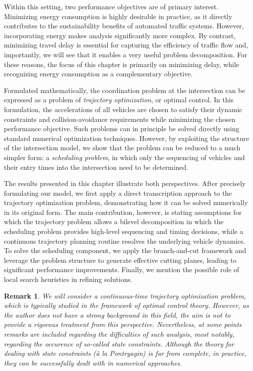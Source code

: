 \documentclass[a4paper]{report}
\theoremstyle{definition}
\theoremstyle{plain}
\newtheorem{remark}{Remark}[chapter]
\newcommand\note[1]{{\color{Navy}#1}}
\begin{document}
Within this setting, two performance objectives are of primary interest.
%
Minimizing energy consumption is highly desirable in practice, as it directly
contributes to the sustainability benefits of automated traffic systems.
%
However, incorporating energy makes analysis significantly more complex.
%
By contrast, minimizing travel delay is essential for capturing the efficiency
of traffic flow and, importantly, we will see that it enables a very useful
problem decomposition.
%
For these reasons, the focus of this chapter is primarily on minimizing delay,
while recognizing energy consumption as a complementary objective.

Formulated mathematically, the coordination problem at the intersection can be
expressed as a problem of \emph{trajectory optimization}, or optimal control.
%
In this formulation, the accelerations of all vehicles are chosen to satisfy
their dynamic constraints and collision-avoidance requirements while minimizing
the chosen performance objective.
%
Such problems can in principle be solved directly using standard numerical
optimization techniques.
%
However, by exploiting the structure of the intersection model, we show that the
problem can be reduced to a much simpler form: a \emph{scheduling problem}, in which
only the sequencing of vehicles and their entry times into the intersection need
to be determined.


The results presented in this chapter illustrate both perspectives.
%
After precisely formulating our model, we first apply a direct transcription
approach to the trajectory optimization problem, demonstrating how it can be
solved numerically in its original form.
%
The main contribution, however, is stating assumptions for which the trajectory
problem allows a bilevel decomposition in which the scheduling problem provides
\pagebreak
high-level sequencing and timing decisions, while a continuous trajectory
planning routine resolves the underlying vehicle dynamics.
%
To solve the scheduling component, we apply the branch-and-cut framework and
leverage the problem structure to generate effective cutting planes, leading to
significant performance improvements.
%
Finally, we mention the possible role of local search heuristics in refining
solutions.

\begin{remark}
  We will consider a continuous-time trajectory optimization problem, which is
  typically studied in the framework of optimal control theory. However, as the
  author does not have a strong background in this field, the aim is not to
  provide a rigorous treatment from this perspective. Nevertheless, at some
  points remarks are included regarding the difficulties of such analysis, most
  notably, regarding the occurence of so-called state constraints.
  \note{Although the theory for dealing with state constraints (\`a la
    Pontryagin) is far from complete, in practice, they can be successfully
    dealt with in numerical approaches.}
\end{remark}
\end{document}
